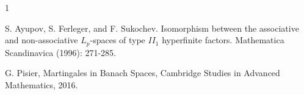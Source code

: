 \documentclass[a4paper, 11pt]{article}
\begin{document}
\begin{thebibliography}{1}


S. Ayupov,  S. Ferleger, and F.  Sukochev. Isomorphism between the associative and non-associative $L_p$-spaces of type $II_1$ hyperfinite factors. Mathematica Scandinavica (1996): 271-285.

G. Pisier, Martingales in Banach Spaces, Cambridge Studies in Advanced Mathematics, 2016. 
\end{thebibliography}
\end{document}
